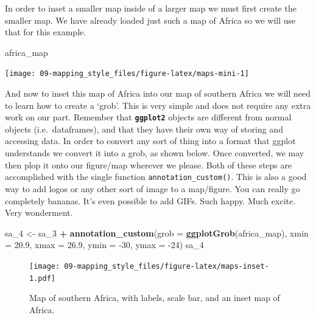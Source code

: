 \documentclass[
]{book}
\newenvironment{Shaded}{\begin{snugshade}}{\end{snugshade}}
\newcommand{\DataTypeTok}[1]{\textcolor[rgb]{0.13,0.29,0.53}{#1}}
\newcommand{\DecValTok}[1]{\textcolor[rgb]{0.00,0.00,0.81}{#1}}
\newcommand{\FloatTok}[1]{\textcolor[rgb]{0.00,0.00,0.81}{#1}}
\newcommand{\KeywordTok}[1]{\textcolor[rgb]{0.13,0.29,0.53}{\textbf{#1}}}
\newcommand{\NormalTok}[1]{#1}
\newcommand{\OperatorTok}[1]{\textcolor[rgb]{0.81,0.36,0.00}{\textbf{#1}}}
\newcommand{\StringTok}[1]{\textcolor[rgb]{0.31,0.60,0.02}{#1}}
\begin{document}
In order to inset a smaller map inside of a larger map we must first create the smaller map. We have already loaded just such a map of Africa so we will use that for this example.

\begin{Shaded}
\begin{Highlighting}[]
\NormalTok{africa\_map}
\end{Highlighting}
\end{Shaded}

\begin{center}\texttt{[image: 09-mapping\_style\_files/figure-latex/maps-mini-1]} \end{center}

And now to inset this map of Africa into our map of southern Africa we will need to learn how to create a `grob'. This is very simple and does not require any extra work on our part. Remember that \textbf{\texttt{ggplot2}} objects are different from normal objects (i.e.~dataframes), and that they have their own way of storing and accessing data. In order to convert any sort of thing into a format that ggplot understands we convert it into a grob, as shown below. Once converted, we may then plop it onto our figure/map wherever we please. Both of these steps are accomplished with the single function \texttt{annotation\_custom()}. This is also a good way to add logos or any other sort of image to a map/figure. You can really go completely bananas. It's even possible to add GIFs. Such happy. Much excite. Very wonderment.

\begin{Shaded}
\begin{Highlighting}[]
\NormalTok{sa\_}\DecValTok{4}\NormalTok{ <{-}}\StringTok{ }\NormalTok{sa\_}\DecValTok{3} \OperatorTok{+}
\StringTok{  }\KeywordTok{annotation\_custom}\NormalTok{(}\DataTypeTok{grob =} \KeywordTok{ggplotGrob}\NormalTok{(africa\_map),}
                    \DataTypeTok{xmin =} \FloatTok{20.9}\NormalTok{, }\DataTypeTok{xmax =} \FloatTok{26.9}\NormalTok{,}
                    \DataTypeTok{ymin =} \DecValTok{{-}30}\NormalTok{, }\DataTypeTok{ymax =} \DecValTok{{-}24}\NormalTok{)}
\NormalTok{sa\_}\DecValTok{4}
\end{Highlighting}
\end{Shaded}

\begin{figure}
\centering
\texttt{[image: 09-mapping\_style\_files/figure-latex/maps-inset-1.pdf]}
\caption{\label{fig:maps-inset}Map of southern Africa, with labels, scale bar, and an inset map of Africa.}
\end{figure}
\end{document}
